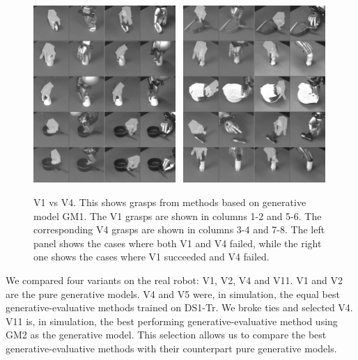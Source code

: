 \begin{figure}
\begin{center}
\includegraphics[width=0.48\textwidth]{plots/A2fA9f_vertical.jpg}~
\includegraphics[width=0.48\textwidth]{plots/A2sA9f_vertical.jpg}
\caption{V1 vs V4. This shows grasps from methods based on generative model GM1. The V1 grasps are shown in columns 1-2 and 5-6. The corresponding V4 grasps are shown in columns 3-4 and 7-8. The left panel shows the cases where both V1 and V4 failed, while the right one shows the cases where V1 succeeded and V4 failed. \label{fig:v1fsv4f}}
\end{center}
\end{figure}

We compared four variants on the real robot: V1, V2, V4 and V11. V1 and V2 are the pure generative models. V4 and V5 were, in simulation, the equal best generative-evaluative methods trained on DS1-Tr. We broke ties and selected V4. V11 is, in simulation, the best performing generative-evaluative method using GM2 as the generative model. This selection allows us to compare the best generative-evaluative methods with their counterpart pure generative models. 

